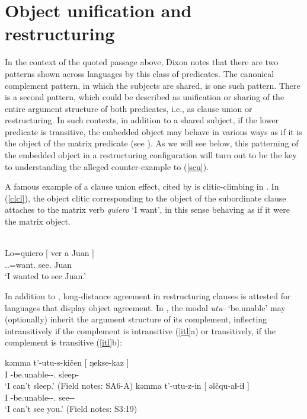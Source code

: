 \documentclass[output=paper]{langsci/langscibook}
\begin{document}
\section{Object unification and restructuring}

In the context of the quoted passage above, Dixon notes that there are two
patterns shown across languages by this class of predicates. The canonical
complement  pattern, in which the subjects are shared, is one such
pattern. There is a second pattern, which could be described as unification or
sharing of the entire argument structure of both predicates, i.e., as clause
union or restructuring. In such contexts, in addition to a shared subject, if
the lower predicate is transitive, the embedded object may behave in various
ways as if it is the object of the matrix predicate (see
\citealp{Wurmbrand2001}). As we will see below, this patterning of the embedded
object in a restructuring configuration will turn out to be the key to
understanding the alleged  counter-example to (\ref{scu}).

A famous example of a clause union effect, cited by \cite{bicknich01} is
clitic-climbing in . In (\ref{clcl}), the object clitic corresponding to
the object of the subordinate clause attaches to the matrix verb \emph{quiero}
`I want', in this sense behaving as if it were the matrix object.

\ea \label{clcl} \\
    \gll Lo=quiero [ ver a Juan ] \\
	\Tsg{}.\M{}.\Acc{}=want.\Fsg{} {} see.\Inf{} \Acc{} Juan {} \\
	\glt `I wanted to see Juan.'
\z

In addition to , long-distance
agreement in restructuring clauses is
attested for languages that display object agreement. In , the modal \emph{utu-} `be.unable' may (optionally)
inherit the argument structure of its complement, inflecting intransitively if
the complement is intransitive (\ref{itl}a) or transitively, if the complement
is transitive (\ref{itl}b):

\ea \label{itl} 
	\begin{xlista}
	\ex \gll kəmma t'-utu-s-ki\v{c}en [ ŋekse-kaz ] \\
    I \Fsg{}-be.unable-\Prs-\Fsg.\Sbj{} {} sleep-\Nfin{} {}\\
	\glt `I can't sleep.' (Field notes: SA6-A)
	\ex \gll kəmma t'-utu-z-in [ əl\v{c}qu-aɬ-iɬ ] \\
    I \Fsg{}-be.unable-\Prs-\Ssg.\Obj{} {} see-\Fut-\Nfin{} {}\\
	\glt `I can't see you.' (Field notes: S3:19)
	\end{xlista}
\z
\end{document}
